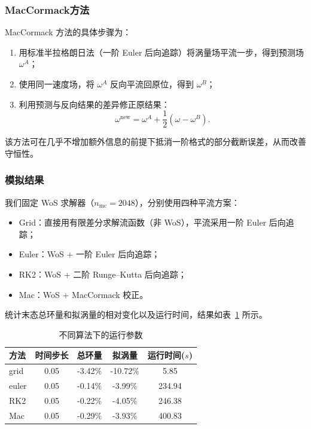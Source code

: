 \documentclass[UTF8,fontset=fandol]{ctexart}
\begin{document}
\subsubsection{MacCormack方法}
MacCormack 方法的具体步骤为：
\begin{enumerate}
    \item 用标准半拉格朗日法（一阶 Euler 后向追踪）将涡量场平流一步，得到预测场 $\omega^A$；
    \item 使用同一速度场，将 $\omega^A$ 反向平流回原位，得到 $\omega^B$；
    \item 利用预测与反向结果的差异修正原结果：
    \[
    \omega^{\text{new}} = \omega^A + \frac{1}{2}\left(\omega - \omega^B\right).
    \]
\end{enumerate}

该方法可在几乎不增加额外信息的前提下抵消一阶格式的部分截断误差，从而改善守恒性。
\subsubsection{模拟结果}

我们固定 WoS 求解器（$n_{\mathrm{mc}}=2048$），分别使用四种平流方案：
\begin{itemize}
    \item Grid：直接用有限差分求解流函数（非 WoS），平流采用一阶 Euler 后向追踪；
    \item Euler：WoS + 一阶 Euler 后向追踪；
    \item RK2：WoS + 二阶 Runge–Kutta 后向追踪；
    \item Mac：WoS + MacCormack 校正。
\end{itemize}

统计末态总环量和拟涡量的相对变化以及运行时间，结果如表~\ref{tab:scheme} 所示。

\begin{table}
\centering
\caption{不同算法下的运行参数}
\label{tab:scheme}
\begin{tabular}{lcccc}
\toprule
方法 & 时间步长 & 总环量 & 拟涡量 & 运行时间($s$)\\
\midrule
grid & 0.05 & -3.42\% & -10.72\% & 5.85\\
euler & 0.05 & -0.14\% & -3.99\% & 234.94\\
RK2 &  0.05 & -0.22\% & -4.05\% & 246.38\\
Mac &  0.05 & -0.29\% & -3.93\% & 400.83\\
\bottomrule
\end{tabular}
\end{table}
\end{document}
